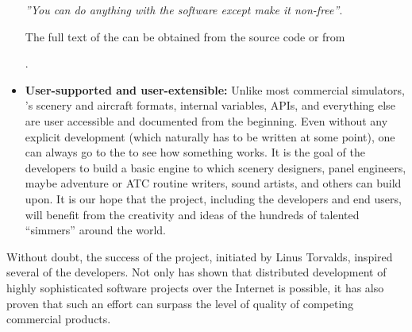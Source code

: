 \begin{itemize}
\centerline{\textit{''You can do anything with the software except make it non-free''}.}

The full text of the  can be obtained from the \FlightGear{} source code or from
 \medskip

.
 \medskip

\item\textbf{User-supported and user-extensible:}
   Unlike most commercial simulators,
  \FlightGear{}'s scenery and aircraft formats, internal variables, APIs, and everything
  else are user accessible and documented from the beginning. Even without any explicit
  development  (which naturally has to be written at some point),
  one can always go to the  to see how something works. It is the
  goal of the developers to build a basic engine to which scenery designers, panel
  engineers, maybe adventure or ATC routine writers, sound artists, and others can build
  upon. It is our hope that the project, including the developers and end users, will
  benefit from the creativity and ideas of the hundreds of talented ``simmers'' around
  the world.
\end{itemize}

  Without doubt, the success of the  project, initiated by Linus
  Torvalds, inspired several of the developers.
  Not only has  shown that distributed development of highly
  sophisticated software projects over the Internet is possible, it has also
  proven that such an effort can surpass the level of quality of competing
  commercial products.
\medskip

 \centerline{}

